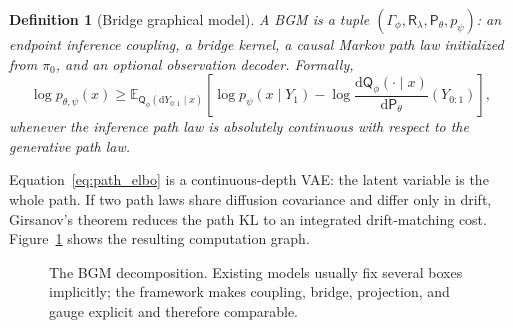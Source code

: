 \documentclass{article}
\newtheorem{definition}{Definition}
\numberwithin{equation}{section}
\newcommand{\E}{\mathbb{E}}
\newcommand{\dd}{\mathrm{d}}
\newcommand{\pbase}{\pi_0}
\newcommand{\scrR}{\mathsf{R}}
\newcommand{\scrP}{\mathsf{P}}
\newcommand{\scrQ}{\mathsf{Q}}
\begin{document}
\begin{definition}[Bridge graphical model]
A BGM is a tuple $(\Gamma_\phi,\scrR_\lambda,\scrP_\theta,p_\psi)$: an endpoint inference coupling, a bridge kernel, a causal Markov path law initialized from $\pbase$, and an optional observation decoder. Formally,
\begin{equation}
\log p_{\theta,\psi}(x)\ge
\E_{\scrQ_\phi(\dd Y_{0:1}\mid x)}\left[
\log p_\psi(x\mid Y_1)-\log\frac{\dd\scrQ_\phi(\cdot\mid x)}{\dd\scrP_\theta}(Y_{0:1})\right],
\label{eq:path_elbo}
\end{equation}
whenever the inference path law is absolutely continuous with respect to the generative path law.
\end{definition}

Equation~\eqref{eq:path_elbo} is a continuous-depth VAE: the latent variable is the whole path. If two path laws share diffusion covariance and differ only in drift, Girsanov's theorem reduces the path KL to an integrated drift-matching cost. Figure~\ref{fig:bgm} shows the resulting computation graph.

\begin{figure}[t]
\centering
{}
\caption{The BGM decomposition. Existing models usually fix several boxes implicitly; the framework makes coupling, bridge, projection, and gauge explicit and therefore comparable.}
\label{fig:bgm}
\end{figure}
\end{document}
